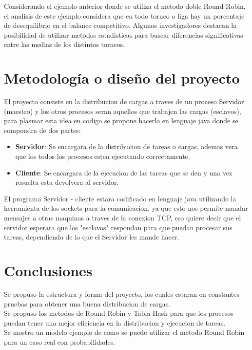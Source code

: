 \documentclass[conference,letterpaper]{IEEEtran}
\begin{document}
Considerando el ejemplo anterior donde se utiliza el metodo doble Round Robin, el analisis de este ejemplo considera que en todo torneo o liga hay un porcentaje de desequilibrio en el balance competitivo. Algunos investigadores destacan la posibilidad de utilizar metodos estadisticas para buscar diferencias significativas entre las medias de los distintos torneos.

\section{Metodolog\'ia o diseño del proyecto}
El proyecto consiste en la distribucion de cargas a traves de un proceso Servidor (maestro) y los otros procesos seran aquellos que  trabajen las cargas (esclavos), para plasmar esta idea en codigo se propone hacerlo en lenguaje java donde se compondra de dos partes:

\begin{itemize}
    \item \textbf{Servidor}: Se encargara de la distribucion de tareas o cargas, ademas vera que los todos los procesos esten ejecutando correctamente.
    \item \textbf{Cliente}: Se encargara de la ejecucion de las tareas que se den y una vez resuelta esta devolvera al servidor.
\end{itemize}

El programa Servidor - cliente estara codificado en lenguaje java utilizando la herramienta de los sockets para la comunicacion, ya que esto nos permite mandar mensajes a otras maquinas a traves de la conexion TCP, eso quiere decir que el servidor esperara que los "esclavos" respondan para que puedan procesar sus tareas, dependiendo de lo que el Servidor les mande hacer.
\section{Conclusiones}
Se propuso la estructura y forma del proyecto, los cuales estaran en constantes pruebas para obtener una buena distribucion de cargas.\\

Se propuso los metodos de Round Robin y Tabla Hash para que los procesos puedan tener una mejor eficiencia en la distribucion y ejecucion de tareas.\\

Se mostro un modelo ejemplo de como se puede utilizar el metodo Round Robin para un caso real con probabilidades.
\end{document}
